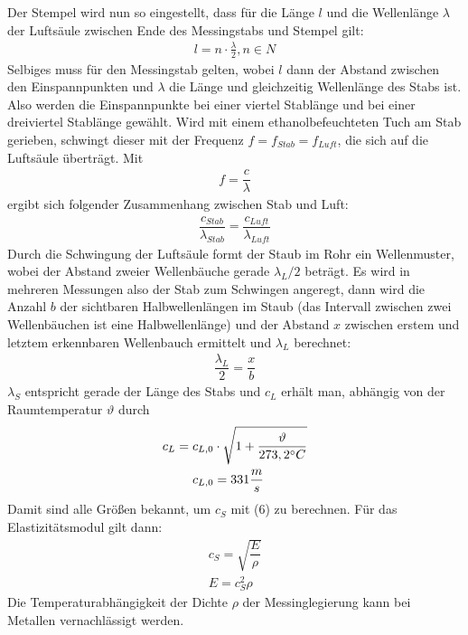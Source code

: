 \documentclass{scrartcl}
\begin{document}
Der Stempel wird nun so eingestellt, dass für die Länge $l$ und die Wellenlänge $\lambda$ der Luftsäule zwischen Ende des Messingstabs und Stempel gilt:
\begin{align}
l = n  \cdot \frac{\lambda}{2}, n \in N
\end{align}
Selbiges muss für den Messingstab gelten, wobei $l$ dann der Abstand zwischen den Einspannpunkten und $\lambda$ die Länge und gleichzeitig Wellenlänge des Stabs ist. Also werden die Einspannpunkte bei einer viertel Stablänge und bei einer dreiviertel Stablänge gewählt.
Wird mit einem ethanolbefeuchteten Tuch am Stab gerieben, schwingt dieser mit der Frequenz $f = f_{Stab} = f_{Luft}$, die sich auf die Luftsäule überträgt. Mit 
\begin{align}
f = \dfrac{c}{\lambda}
\end{align}
ergibt sich folgender Zusammenhang zwischen Stab und Luft:
\begin{align}
\dfrac{c_{Stab}}{\lambda_{Stab}} = \dfrac{c_{Luft}}{\lambda_{Luft}}
\end{align}
Durch die Schwingung der Luftsäule formt der Staub im Rohr ein Wellenmuster, wobei der Abstand zweier Wellenbäuche gerade $\lambda_{L} / 2$ beträgt. 
Es wird in mehreren Messungen also der Stab zum Schwingen angeregt, dann wird die Anzahl $b$ der sichtbaren Halbwellenlängen im Staub (das Intervall zwischen zwei Wellenbäuchen ist eine Halbwellenlänge) und der Abstand $x$ zwischen erstem und letztem erkennbaren Wellenbauch ermittelt und $\lambda_{L}$ berechnet:
\begin{align}
\dfrac{\lambda_{L}}{2} = \dfrac{x}{b}
\end{align}
$\lambda_{S}$ entspricht gerade der Länge des Stabs und $c_{L}$ erhält man, abhängig von der Raumtemperatur $\vartheta$ durch
\begin{align}
c_{L} = c_{L, 0} & \cdot \sqrt{1+\dfrac{\vartheta}{273,2 \degree C}} \\
c_{L, 0} & = 331 \dfrac{m}{s}
\end{align}
Damit sind alle Größen bekannt, um $c_{S}$ mit (6) zu berechnen. Für das Elastizitätsmodul gilt dann:
\begin{align}
c_{S} = \sqrt{\dfrac{E}{\rho}} \\
E = c_{S}^2 \rho
\end{align}
Die Temperaturabhängigkeit der Dichte $\rho$ der Messinglegierung kann bei Metallen vernachlässigt werden.
\end{document}
